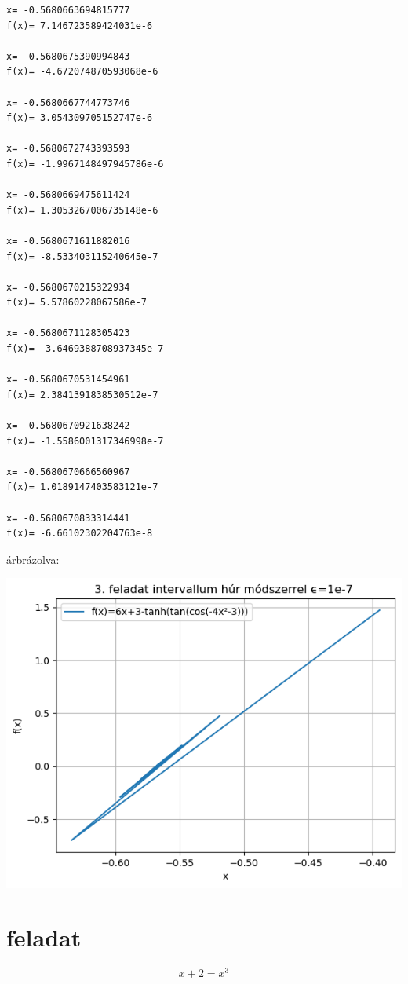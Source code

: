 \documentclass{article}
\begin{document}
\begin{verbatim}
x= -0.5680663694815777
f(x)= 7.146723589424031e-6

x= -0.5680675390994843
f(x)= -4.672074870593068e-6

x= -0.5680667744773746
f(x)= 3.054309705152747e-6

x= -0.5680672743393593
f(x)= -1.9967148497945786e-6

x= -0.5680669475611424
f(x)= 1.3053267006735148e-6

x= -0.5680671611882016
f(x)= -8.533403115240645e-7

x= -0.5680670215322934
f(x)= 5.57860228067586e-7

x= -0.5680671128305423
f(x)= -3.6469388708937345e-7

x= -0.5680670531454961
f(x)= 2.3841391838530512e-7

x= -0.5680670921638242
f(x)= -1.5586001317346998e-7

x= -0.5680670666560967
f(x)= 1.0189147403583121e-7

x= -0.5680670833314441
f(x)= -6.66102302204763e-8
\end{verbatim}

árbrázolva:

\includegraphics[scale=1]{../plot_4.png} 

\section{feladat}
\begin{equation}
x+2 = x^{3}
\end{equation}
\end{document}
